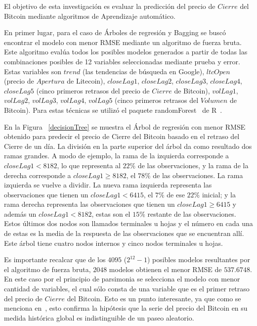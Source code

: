 \documentclass[a4paper,12pt,twocolumn]{article}
\begin{document}
El objetivo de  esta investigación es evaluar la predicción del precio de $Cierre$ del Bitcoin mediante algoritmos de Aprendizaje automático. 

En primer lugar, para el caso de Árboles de regresión y Bagging se buscó encontrar el modelo con menor RMSE mediante un algoritmo de fuerza bruta. Este algoritmo evalúa todos los posibles modelos generados a partir de todas las combinaciones posibles de 12 variables seleccionadas mediante prueba y error. Estas variables son $trend$ (las tendencias de búsqueda en Google), $ltcOpen$ (precio de $Apertura$ de Litecoin), $closeLag1$, $closeLag2$, $closeLag3$, $closeLag4$, $closeLag5$ (cinco primeros retrasos del precio de $Cierre$ de Bitcoin), $volLag1$, $volLag2$, $volLag3$, $volLag4$, $volLag5$ (cinco primeros retrasos del $Volumen$ de Bitcoin). Para estas técnicas se utilizó el paquete randomForest~\cite{randomForest} de R~\cite{r}.

En la Figura ~\ref{decisionTree}  se muestra el Árbol de regresión con menor RMSE obtenido para predecir el precio de Cierre del Bitcoin basado en el retraso del Cierre de un día. La división en la parte superior del árbol da como resultado dos ramas grandes. A modo de ejemplo, la rama de la izquierda corresponde a $closeLag1<8182$, lo que representa al $22\%$ de las observaciones, y la rama de la derecha corresponde a $closeLag1 \geq 8182$, el $78\%$ de las observaciones. La rama izquierda se vuelve a dividir. La nueva rama izquierda representa las observaciones que tienen un $closeLag1<6415$, el $7\%$ de ese $22\%$ inicial; y la rama derecha representa las observaciones que tienen un  $closeLag1 \geq 6415$ y además un $closeLag1<8182$, estas son el $15\%$ restante de las observaciones. Estos últimos dos nodos son llamados terminales u hojas y el número en cada una de estas es la media de la respuesta de las observaciones que se encuentran allí. Este árbol tiene cuatro nodos internos y cinco nodos terminales u hojas.

Es importante recalcar que de los $4095$ ($2^{12} - 1$) posibles modelos resultantes por el algoritmo de fuerza bruta, $2048$ modelos obtienen el menor RMSE de $537.6748$. En este caso por el principio de parsimonia se selecciona el modelo con menor cantidad de variables, el cual sólo consta de una variable que es el primer retraso del precio de $Cierre$ del Bitcoin. 
Esto es un punto interesante, ya que como se menciona en~\cite{forecastinBitcoinClosing}, esto confirma la hipótesis que la serie del precio del Bitcoin en su medida histórica global es indistinguible de un paseo aleatorio. 
\end{document}
